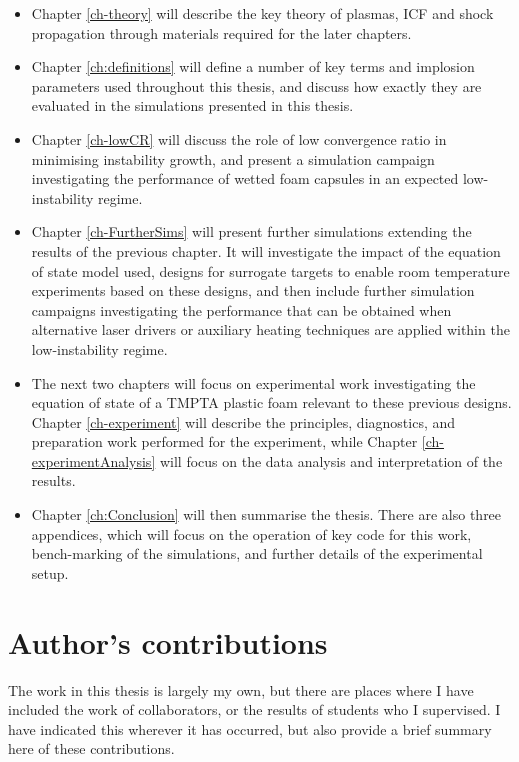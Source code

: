 \begin{itemize}
	\item Chapter \ref{ch-theory} will describe the key theory of plasmas, ICF and shock propagation through materials required for the later chapters.
	\item Chapter \ref{ch:definitions} will define a number of key terms and implosion parameters used throughout this thesis, and discuss how exactly they are evaluated in the simulations presented in this thesis.
	\item Chapter \ref{ch-lowCR} will discuss the role of low convergence ratio in minimising instability growth, and present a simulation campaign investigating the performance of wetted foam capsules in an expected low-instability regime.
	\item Chapter \ref{ch-FurtherSims} will present further simulations extending the results of the previous chapter. It will investigate the impact of the equation of state model used, designs for surrogate targets to enable room temperature experiments based on these designs, and then include further simulation campaigns investigating the performance that can be obtained when alternative laser drivers or auxiliary heating techniques are applied within the low-instability regime.
	\item The next two chapters will focus on experimental work investigating the equation of state of a TMPTA plastic foam relevant to these previous designs. Chapter \ref{ch-experiment} will describe the principles, diagnostics, and preparation work performed for the experiment, while Chapter \ref{ch-experimentAnalysis} will focus on the data analysis and interpretation of the results.
	\item Chapter \ref{ch:Conclusion} will then summarise the thesis. There are also three appendices, which will focus on the operation of key code for this work, bench-marking of the simulations, and further details of the experimental setup.
\end{itemize}

\section{Author's contributions}

The work in this thesis is largely my own, but there are places where I have included the work of collaborators, or the results of students who I supervised. I have indicated this wherever it has occurred, but also provide a brief summary here of these contributions.

